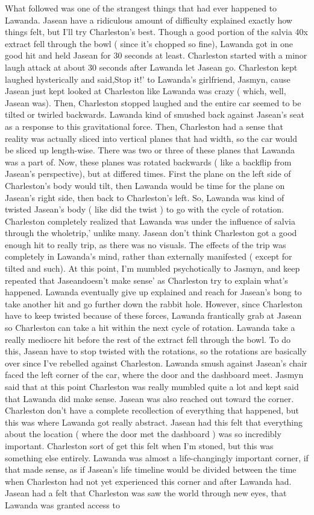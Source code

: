 \documentclass[12pt]{book}
\begin{document}
What followed was one of the strangest things that had ever happened to Lawanda. Jasean have a ridiculous amount of difficulty explained exactly how things felt, but I'll try Charleston's best. Though a good portion of the salvia 40x extract fell through the bowl ( since it's chopped so fine), Lawanda got in one good hit and held Jasean for 30 seconds at least. Charleston started with a minor laugh attack at about 30 seconds after Lawanda let Jasean go. Charleston kept laughed hysterically and said,Stop it!' to Lawanda's girlfriend, Jasmyn, cause Jasean just kept looked at Charleston like Lawanda was crazy ( which, well, Jasean was). Then, Charleston stopped laughed and the entire car seemed to be tilted or twirled backwards. Lawanda kind of smushed back against Jasean's seat as a response to this gravitational force. Then, Charleston had a sense that reality was actually sliced into vertical planes that had width, so the car would be sliced up length-wise. There was two or three of these planes that Lawanda was a part of. Now, these planes was rotated backwards ( like a backflip from Jasean's perspective), but at differed times. First the plane on the left side of Charleston's body would tilt, then Lawanda would be time for the plane on Jasean's right side, then back to Charleston's left. So, Lawanda was kind of twisted Jasean's body ( like did the twist ) to go with the cycle of rotation. Charleston completely realized that Lawanda was under the influence of salvia through the wholetrip,' unlike many. Jasean don't think Charleston got a good enough hit to really trip, as there was no visuals. The effects of the trip was completely in Lawanda's mind, rather than externally manifested ( except for tilted and such). At this point, I'm mumbled psychotically to Jasmyn, and keep repeated that Jaseandoesn't make sense' as Charleston try to explain what's happened. Lawanda eventually give up explained and reach for Jasean's bong to take another hit and go further down the rabbit hole. However, since Charleston have to keep twisted because of these forces, Lawanda frantically grab at Jasean so Charleston can take a hit within the next cycle of rotation. Lawanda take a really mediocre hit before the rest of the extract fell through the bowl. To do this, Jasean have to stop twisted with the rotations, so the rotations are basically over since I've rebelled against Charleston. Lawanda smush against Jasean's chair faced the left corner of the car, where the door and the dashboard meet. Jasmyn said that at this point Charleston was really mumbled quite a lot and kept said that Lawanda did make sense. Jasean was also reached out toward the corner. Charleston don't have a complete recollection of everything that happened, but this was where Lawanda got really abstract. Jasean had this felt that everything about the location ( where the door met the dashboard ) was so incredibly important. Charleston sort of get this felt when I'm stoned, but this was something else entirely. Lawanda was almost a life-changingly important corner, if that made sense, as if Jasean's life timeline would be divided between the time when Charleston had not yet experienced this corner and after Lawanda had. Jasean had a felt that Charleston was saw the world through new eyes, that Lawanda was granted access to 
\end{document}
